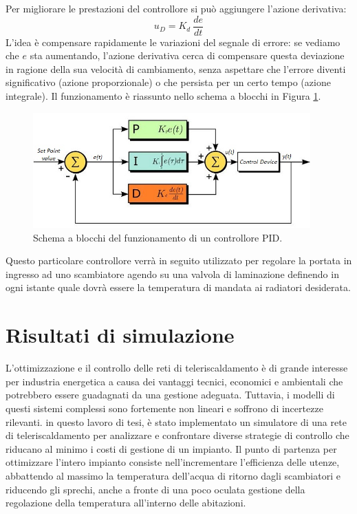 \documentclass[laurea,oneside,11pt]{USiena_tesiLM}
\begin{document}
Per migliorare le prestazioni del controllore si può aggiungere l'azione derivativa:
\begin{equation}
u_D = K_d \ \dfrac{de}{dt} 
\end{equation}
L'idea è compensare rapidamente le variazioni del segnale di errore: se vediamo che $e$ sta aumentando, l'azione derivativa cerca di compensare questa deviazione in ragione della sua velocità di cambiamento, senza aspettare che l'errore diventi significativo (azione proporzionale) o che persista per un certo tempo (azione integrale).
Il funzionamento è riassunto nello  schema a blocchi in Figura \ref{fig:PID2}.

\begin{figure}[!ht]
\centering
\includegraphics[width=0.95\textwidth]{figure/PID2} 
\caption{Schema a blocchi del funzionamento di un controllore PID.}
\label{fig:PID2}
\end{figure}

Questo particolare controllore verrà in seguito utilizzato per regolare la portata in ingresso ad uno scambiatore agendo su una valvola di laminazione definendo in ogni istante quale dovrà essere la temperatura di mandata ai radiatori desiderata.

\chapter{Risultati di simulazione}
L'ottimizzazione e il controllo delle reti di teleriscaldamento è di grande interesse per industria energetica a causa dei vantaggi tecnici, economici e ambientali che potrebbero essere guadagnati da una gestione adeguata. Tuttavia, i modelli di questi sistemi complessi sono fortemente non lineari  e soffrono di incertezze rilevanti. in questo lavoro di tesi, è stato implementato un simulatore di una rete di teleriscaldamento per analizzare e confrontare diverse strategie di controllo che riducano al minimo i costi di gestione di un impianto.
Il punto di partenza per ottimizzare l'intero impianto consiste nell'incrementare l'efficienza delle utenze, abbattendo al massimo la temperatura dell'acqua di ritorno dagli scambiatori 
e riducendo gli sprechi, anche a fronte di una poco oculata gestione della regolazione della temperatura all'interno delle abitazioni.
\end{document}
